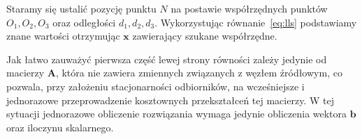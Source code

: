 Staramy się ustalić pozycję punktu $N$ na postawie współrzędnych punktów $O_1, O_2, O_3$ oraz odległości $d_1, d_2, d_3$. Wykorzystując równanie~\ref{eq:lls} podstawiamy znane wartości otrzymując $\mathbf{x}$ zawierający szukane współrzędne.

Jak łatwo zauważyć pierwsza część lewej strony równości zależy jedynie od macierzy $\mathbf{A}$, która nie zawiera zmiennych związanych z węzłem źródłowym, co pozwala, przy założeniu stacjonarności odbiorników, na wcześniejsze i jednorazowe przeprowadzenie kosztownych przekształceń tej macierzy. W tej sytuacji jednorazowe obliczenie rozwiązania wymaga jedynie obliczenia wektora $\mathbf{b}$ oraz iloczynu skalarnego.
